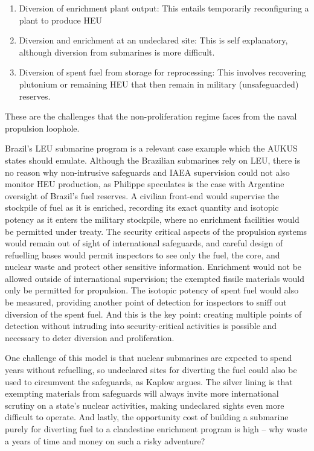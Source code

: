 \documentclass[letterpaper,12pt,twoside]{article} %
\begin{document}
\begin{multicols}{2}
\begin{enumerate}
  \item Diversion of enrichment plant output: This entails temporarily reconfiguring a plant to produce HEU
  \item Diversion and enrichment at an undeclared site: This is self explanatory, although diversion from submarines is more difficult.
  \item Diversion of spent fuel from storage for reprocessing: This involves recovering plutonium or remaining HEU that then remain in military (unsafeguarded) reserves.
\end{enumerate}

These are the challenges that the non-proliferation regime faces from the naval propulsion loophole.

Brazil's LEU submarine program is a relevant case example which the AUKUS states should emulate. Although the Brazilian submarines rely on LEU, there is no reason why non-intrusive safeguards and IAEA supervision could not also monitor HEU production, as Philippe speculates is the case with Argentine oversight of Brazil's fuel reserves.\autocite[46]{philippe2014safeguarding} A civilian front-end would supervise the stockpile of fuel as it is enriched, recording its exact quantity and isotopic potency as it enters the military stockpile, where no enrichment facilities would be permitted under treaty. The security critical aspects of the propulsion systems would remain out of sight of international safeguards, and careful design of refuelling bases would permit inspectors to see only the fuel, the core, and nuclear waste and protect other sensitive information. Enrichment would not be allowed outside of international supervision; the exempted fissile materials would only be permitted for propulsion.\autocite[18]{rockwood2017} The isotopic potency of spent fuel would also be measured, providing another point of detection for inspectors to sniff out diversion of the spent fuel. And this is the key point: creating multiple points of detection without intruding into security-critical activities is possible and necessary to deter diversion and proliferation.

One challenge of this model is that nuclear submarines are expected to spend years without refuelling, so undeclared sites for diverting the fuel could also be used to circumvent the safeguards, as Kaplow argues.\autocite[195]{kaplow2015canary} The silver lining is that exempting materials from safeguards will always invite more international scrutiny on a state's nuclear activities, making undeclared sights even more difficult to operate. And lastly, the opportunity cost of building a submarine purely for diverting fuel to a clandestine enrichment program is high -- why waste a years of time and money on such a risky adventure?


\end{multicols}
\end{document}

